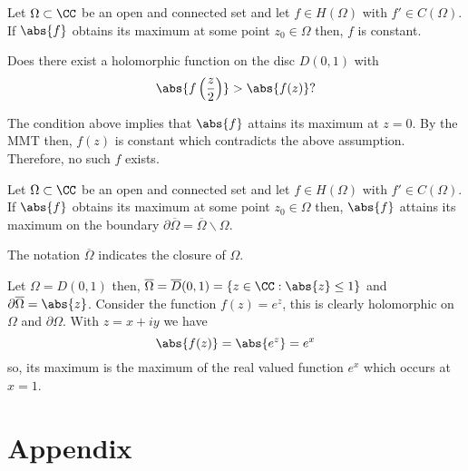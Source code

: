 \documentclass[12pt, a4paper]{article}
\begin{document}
\begin{mdthm}
    Let \(\Omega \subset \CC\) be an open and connected set and let  \(f \in H(\Omega)\) with \(f' \in C(\Omega)\). If \(\abs{f}\) obtains its maximum at some point \(z_0 \in \Omega\) then, \(f\) is constant.
\end{mdthm}

\begin{mdexample}
    Does there exist a holomorphic function on the disc \(D(0,1)\) with 
    \[\abs{f \left( \frac{z}{2} \right)} > \abs{f(z)}?\]
    \begin{solution}
        The condition above implies that \(\abs{f}\) attains its maximum at \(z=0\). By the MMT then, \(f(z)\) is constant which contradicts the above assumption. Therefore, no such \(f\) exists.
    \end{solution}
\end{mdexample}

\begin{mdthm}[MMT 2]
    Let \(\Omega \subset \CC\) be an open and connected set and let  \(f \in H(\Omega)\) with \(f' \in C(\Omega)\). If \(\abs{f}\) obtains its maximum at some point \(z_0 \in \Omega\) then, \(\abs{f}\) attains its maximum on the boundary \(\partial \overline{\Omega} = \overline{\Omega} \backslash \Omega\).
\end{mdthm}

\begin{mdremark}
    The notation \(\overline{\Omega}\) indicates the closure of \(\Omega\).
\end{mdremark}

\begin{mdexample}
    Let \(\Omega = D(0,1)\) then, \(\overline{\Omega} = \overline{D}(0,1) = \{z \in \CC : \abs{z} \leq 1\}\) and \(\partial \overline{\Omega} = \abs{z}\). Consider the function \(f(z)=e^z\), this is clearly holomorphic on \(\Omega\) and \(\partial \Omega\). With \(z=x+iy\) we have 
    \[\abs{f(z)}=\abs{e^z}=e^x\]
    so, its maximum is the maximum of the real valued function \(e^x\) which occurs at \(x=1\).
\end{mdexample}

\pagebreak

\appendix

\section*{Appendix}
\end{document}
